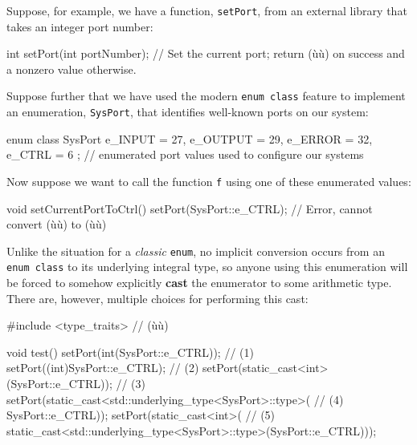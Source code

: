 Suppose, for example, we have a function, \texttt{setPort}, from an
external library that takes an integer port number:

\begin{emcppslisting}[emcppsbatch=e11]
int setPort(int portNumber);
    // Set the current port; return (ù{}ù) on success and a nonzero value otherwise.
\end{emcppslisting}

\noindent Suppose further that we have used the modern
\texttt{enum}~\texttt{class} feature to implement an enumeration,
\texttt{SysPort}, that identifies well-known ports on our system:

\begin{emcppslisting}[emcppsbatch=e11]
enum class SysPort { e_INPUT = 27, e_OUTPUT = 29, e_ERROR = 32, e_CTRL = 6 };
    // enumerated port values used to configure our systems
\end{emcppslisting}

\noindent Now suppose we want to call the function \texttt{f} using one of these
enumerated values:

\begin{emcppslisting}[emcppsbatch=e11]
void setCurrentPortToCtrl()
{
    setPort(SysPort::e_CTRL);  // Error, cannot convert (ù{}ù) to (ù{}ù)
}
\end{emcppslisting}

\noindent Unlike the situation for a \emph{classic} \texttt{enum}, no implicit
conversion occurs from an \texttt{enum}~\texttt{class} to its underlying
integral type, so anyone using this enumeration will be forced to
somehow explicitly \textbf{cast} the enumerator to some arithmetic type.
There are, however, multiple choices for performing this cast:

\begin{emcppslisting}[emcppsbatch=e11]
#include <type_traits>  // (ù{}ù)

void test()
{
    setPort(int(SysPort::e_CTRL));                                       // (1)
    setPort((int)SysPort::e_CTRL);                                       // (2)
    setPort(static_cast<int>(SysPort::e_CTRL));                          // (3)
    setPort(static_cast<std::underlying_type<SysPort>::type>(            // (4)
                                                         SysPort::e_CTRL));
    setPort(static_cast<int>(                                            // (5)
             static_cast<std::underlying_type<SysPort>::type>(SysPort::e_CTRL)));
}
\end{emcppslisting}

